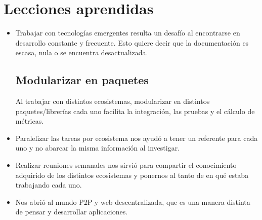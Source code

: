 \section{Lecciones aprendidas}

\begin{itemize}
    \item Trabajar con tecnologías emergentes resulta un desafío al encontrarse en desarrollo constante y frecuente. Esto quiere decir que la documentación es escasa, nula o se encuentra desactualizada.

    \subsection{Modularizar en paquetes}
    Al trabajar con distintos ecosistemas, modularizar en distintos paquetes/librerías cada uno facilita la integración, las pruebas y el cálculo de métricas.

    \item Paralelizar las tareas por ecosistema nos ayudó a tener un referente para cada uno y no abarcar la misma información al investigar.

    \item Realizar reuniones semanales nos sirvió para compartir el conocimiento adquirido de los distintos ecosistemas y ponernos al tanto de en qué estaba trabajando cada uno.

    \item Nos abrió al mundo P2P y web descentralizada, que es una manera distinta de pensar y desarrollar aplicaciones.

\end{itemize}